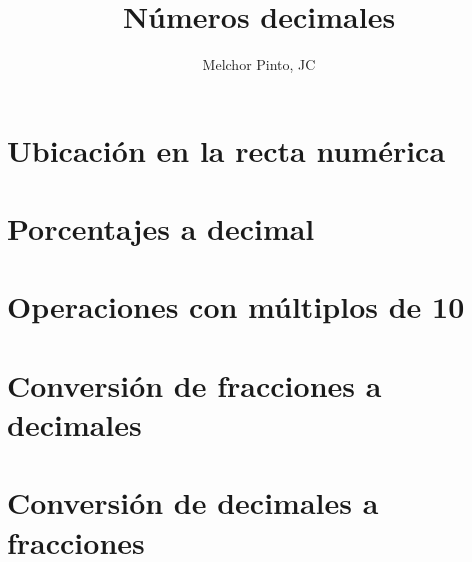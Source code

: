 \documentclass{guia}
\title{Números decimales}
\author{Melchor Pinto, JC}
\begin{document}
\INFO%
\begin{questions}
\section{Ubicación en la recta numérica}
\questionboxed{}
\section{Porcentajes a decimal}
\questionboxed{}
\section{Operaciones con múltiplos de 10}
\questionboxed{}
\section{Conversión de fracciones a decimales}
\questionboxed{}
\section{Conversión de decimales a fracciones}
\questionboxed{}


\end{questions}
\end{document}
